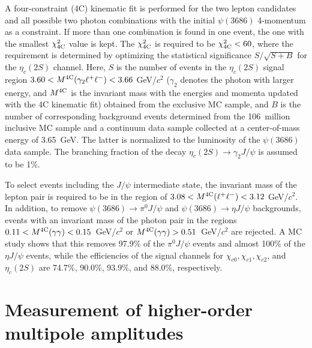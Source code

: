 \documentclass[prd,twocolumn,showpacs,amsmath,amssymb]{revtex4-1}
\begin{document}
A four-constraint (4C) kinematic fit is performed for the two lepton candidates and all possible two photon combinations with the
initial $\psi(3686)$ 4-momentum as a constraint. If more than one combination is found in one event, the one with the smallest $\chi^{2}_{4\rm C}$ value is kept.
The $\chi^{2}_{4\rm C}$ is required to be $\chi^{2}_{4\rm C} < 60$, where the requirement is determined by optimizing the statistical significance $S/\sqrt{S+B}$
for the $\eta_{c}(2S)$ channel.  Here, $S$ is the number of events in the $\eta_{c}(2S)$ signal region
$3.60 < M^{\rm 4C}(\gamma_{2}\ell^{+}\ell^{-}) < 3.66$ GeV/$c^{2}$ ($\gamma_{2}$ denotes the photon with larger energy, and $M^{\rm 4C}$ is the invariant mass with the energies and momenta updated with the 4C kinematic fit) obtained from the exclusive MC sample, and $B$ is the number of corresponding background events determined
from the 106~million inclusive MC sample and a continuum data sample collected at a center-of-mass energy of 3.65~GeV. The latter is normalized to
the luminosity of the $\psi(3686)$ data sample. The branching fraction of the decay $\eta_{c}(2S)\rightarrow\gamma_{2}J/\psi$ is assumed to be 1\%.

To select events including the $J/\psi$ intermediate state, the invariant mass of the lepton pair is required to be in the region of
$3.08 < M^{4\rm C}(\ell^{+}\ell^{-}) < 3.12$ GeV/$c^{2}$. In addition, to remove $\psi(3686)\to\pi^{0}J/\psi$ and $\psi(3686)\to\eta J/\psi$ backgrounds,
events with an invariant mass of the photon pair in the regions $0.11 < M^{4\rm C}(\gamma\gamma) < 0.15$~GeV/$c^{2}$ or
$M^{4\rm C}(\gamma\gamma) > 0.51$~GeV/$c^{2}$ are rejected. A MC study shows that this removes 97.9\% of the $\pi^{0}J/\psi$ events
and almost 100\% of the $\eta J/\psi$ events, while the efficiencies of the signal channels for $\chi_{c0},\chi_{c1},\chi_{c2}$, and $\eta_{c}(2S)$
are 74.7\%, 90.0\%, 93.9\%, and 88.0\%, respectively.

\section{Measurement of higher-order multipole amplitudes}\label{higher_multipole}
\end{document}
